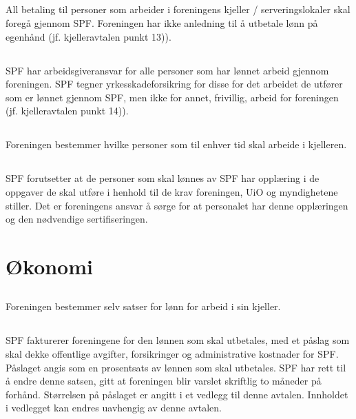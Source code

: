 \documentclass[12pt]{article}
\begin{document}
\subsection{}
\label{sub:2.1}
All betaling til personer som arbeider i foreningens kjeller / serveringslokaler
skal foregå gjennom SPF. Foreningen har ikke anledning til å utbetale lønn på egenhånd 
(jf. kjelleravtalen punkt 13)).
\subsection{}
\label{sub:2.2}
SPF har arbeidsgiveransvar for alle personer som 
har lønnet arbeid gjennom foreningen. SPF tegner 
yrkesskadeforsikring for disse for det arbeidet de 
utfører som er lønnet gjennom SPF, men ikke for 
annet, frivillig, arbeid for foreningen (jf. 
kjelleravtalen punkt 14)).
\subsection{}
\label{sub:2.3}
Foreningen bestemmer hvilke personer som til enhver 
tid skal arbeide i kjelleren.
\subsection{}
\label{sub:2.4}
SPF forutsetter at de personer som skal lønnes av 
SPF har opplæring i de oppgaver de skal utføre i 
henhold til de krav foreningen, UiO og myndighetene 
stiller. Det er foreningens ansvar å sørge for at 
personalet har denne opplæringen og den nødvendige 
sertifiseringen.
\section{Økonomi}
\label{sec:3}
\subsection{}
\label{sub:3.1}
Foreningen bestemmer selv satser for lønn for arbeid i sin kjeller.
\subsection{}
\label{sub:3.2}
SPF fakturerer foreningene for den lønnen som skal 
utbetales, med et påslag som skal dekke offentlige 
avgifter, forsikringer og administrative kostnader 
for SPF. Påslaget angis som en prosentsats av 
lønnen som skal utbetales. SPF har rett til å endre 
denne satsen, gitt at foreningen blir varslet 
skriftlig to måneder på forhånd. Størrelsen på 
påslaget er angitt i et vedlegg til denne avtalen. 
Innholdet i vedlegget kan endres uavhengig av denne 
avtalen.
\end{document}
